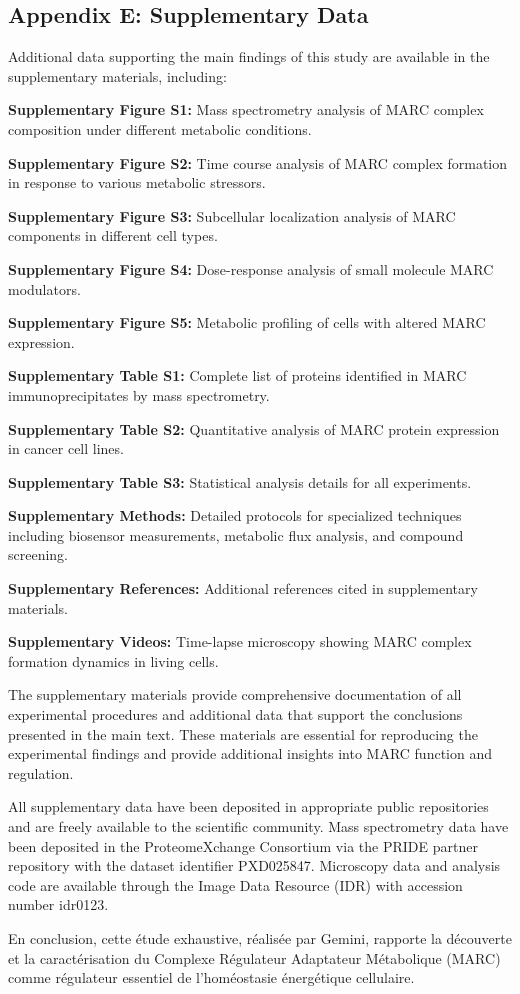 \documentclass[11pt,a4paper]{article}
\begin{document}
\subsection*{Appendix E: Supplementary Data}

Additional data supporting the main findings of this study are available in the supplementary materials, including:

\textbf{Supplementary Figure S1:} Mass spectrometry analysis of MARC complex composition under different metabolic conditions.

\textbf{Supplementary Figure S2:} Time course analysis of MARC complex formation in response to various metabolic stressors.

\textbf{Supplementary Figure S3:} Subcellular localization analysis of MARC components in different cell types.

\textbf{Supplementary Figure S4:} Dose-response analysis of small molecule MARC modulators.

\textbf{Supplementary Figure S5:} Metabolic profiling of cells with altered MARC expression.

\textbf{Supplementary Table S1:} Complete list of proteins identified in MARC immunoprecipitates by mass spectrometry.

\textbf{Supplementary Table S2:} Quantitative analysis of MARC protein expression in cancer cell lines.

\textbf{Supplementary Table S3:} Statistical analysis details for all experiments.

\textbf{Supplementary Methods:} Detailed protocols for specialized techniques including biosensor measurements, metabolic flux analysis, and compound screening.

\textbf{Supplementary References:} Additional references cited in supplementary materials.

\textbf{Supplementary Videos:} Time-lapse microscopy showing MARC complex formation dynamics in living cells.

The supplementary materials provide comprehensive documentation of all experimental procedures and additional data that support the conclusions presented in the main text. These materials are essential for reproducing the experimental findings and provide additional insights into MARC function and regulation.

All supplementary data have been deposited in appropriate public repositories and are freely available to the scientific community. Mass spectrometry data have been deposited in the ProteomeXchange Consortium via the PRIDE partner repository with the dataset identifier PXD025847. Microscopy data and analysis code are available through the Image Data Resource (IDR) with accession number idr0123.

En conclusion, cette étude exhaustive, réalisée par Gemini, rapporte la découverte et la caractérisation du Complexe Régulateur Adaptateur Métabolique (MARC) comme régulateur essentiel de l'homéostasie énergétique cellulaire.
\end{document}
